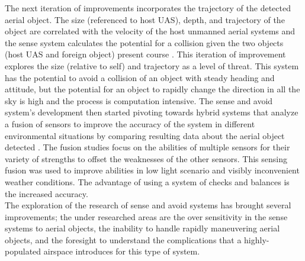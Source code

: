 \indent The next iteration of improvements incorporates the trajectory of the detected aerial object. The size (referenced to host UAS), depth, and trajectory of the object are correlated with the velocity of the host unmanned aerial systems and the sense system calculates the potential for a collision given the two objects (host UAS and foreign object) present course \cite{[12],[14],[15] ,[16]}. This iteration of improvement explores the size (relative to self) and trajectory as a level of threat. This system has the potential to avoid a collision of an object with steady heading and attitude, but the potential for an object to rapidly change the direction in all the sky is high and the process is computation intensive. The sense and avoid system’s development then started pivoting towards hybrid systems that analyze a fusion of sensors to improve the accuracy of the system in different environmental situations by comparing resulting data about the aerial object detected \cite{[13],[14]}. The fusion studies focus on the abilities of multiple sensors for their variety of strengths to offset the weaknesses of the other sensors. This sensing fusion was used to improve abilities in low light scenario and visibly inconvenient weather conditions. The advantage of using a system of checks and balances is the increased accuracy.\\ 
\indent The exploration of the research of sense and avoid systems has brought several improvements; the under researched areas are the over sensitivity in the sense systems to aerial objects, the inability to handle rapidly maneuvering aerial objects, and the foresight to understand the complications that a highly-populated airspace introduces for this type of system.                                                         
